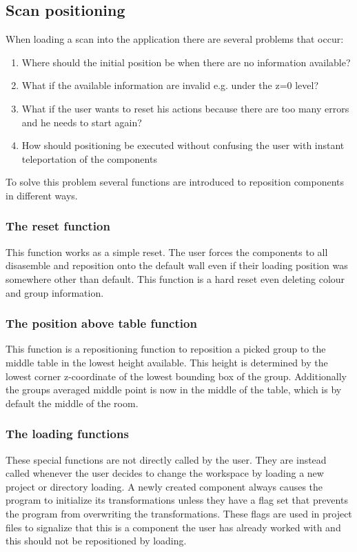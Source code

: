 \documentclass[hyperref,english,bachelorofscience,bibnum]{cgvpub}
\begin{document}
\subsection{Scan positioning}

When loading a scan into the application there are several problems that occur:
\begin{enumerate}
\item Where should the initial position be when there are no information available?
\item What if the available information are invalid e.g. under the z=0 level?
\item What if the user wants to reset his actions because there are too many errors and he needs to start again?
\item How should positioning be executed without confusing the user with instant teleportation of the components
\end{enumerate}
To solve this problem several functions are introduced to reposition components in different ways.


\subsubsection{The reset function}

This function works as a simple reset. The user forces the components to all disasemble and reposition onto the default wall even if their loading position was somewhere other than default. This function is a hard reset even deleting colour and group information.

\subsubsection{The position above table function}

This function is a repositioning function to reposition a picked group to the middle table in the lowest height available. This height is determined by the lowest corner z-coordinate of the lowest bounding box of the group. Additionally the groups averaged middle point is now in the middle of the table, which is by default the middle of the room.

\subsubsection{The loading functions}

These special functions are not directly called by the user. They are instead called whenever the user decides to change the workspace by loading a new project or directory loading. A newly created component always causes the program to initialize its transformations unless they have a flag set that prevents the program from overwriting the transformations. These flags are used in project files to signalize that this is a component the user has already worked with and this should not be repositioned by loading. 
\end{document}
